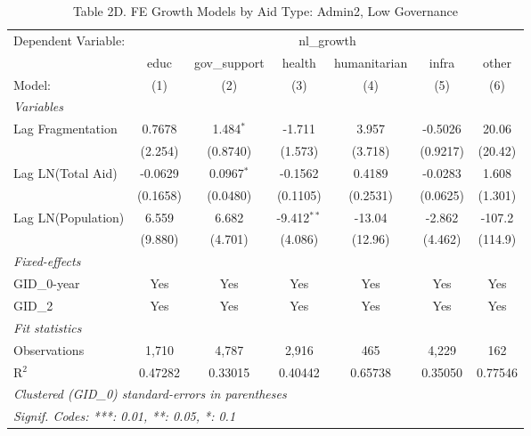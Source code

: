 \begin{table}[htbp]
   \caption{Table 2D. FE Growth Models by Aid Type: Admin2, Low Governance}
   \centering
   \begin{tabular}{lcccccc}
      \tabularnewline \midrule \midrule
      Dependent Variable: & \multicolumn{6}{c}{nl\_growth}\\
                         & educ     & gov\_support  & health        & humanitarian & infra    & other \\   
      Model:             & (1)      & (2)           & (3)           & (4)          & (5)      & (6)\\  
      \midrule
      \emph{Variables}\\
      Lag Fragmentation  & 0.7678   & 1.484$^{*}$   & -1.711        & 3.957        & -0.5026  & 20.06\\   
                         & (2.254)  & (0.8740)      & (1.573)       & (3.718)      & (0.9217) & (20.42)\\   
      Lag LN(Total Aid)  & -0.0629  & 0.0967$^{*}$  & -0.1562       & 0.4189       & -0.0283  & 1.608\\   
                         & (0.1658) & (0.0480)      & (0.1105)      & (0.2531)     & (0.0625) & (1.301)\\   
      Lag LN(Population) & 6.559    & 6.682         & -9.412$^{**}$ & -13.04       & -2.862   & -107.2\\   
                         & (9.880)  & (4.701)       & (4.086)       & (12.96)      & (4.462)  & (114.9)\\   
      \midrule
      \emph{Fixed-effects}\\
      GID\_0-year        & Yes      & Yes           & Yes           & Yes          & Yes      & Yes\\  
      GID\_2             & Yes      & Yes           & Yes           & Yes          & Yes      & Yes\\  
      \midrule
      \emph{Fit statistics}\\
      Observations       & 1,710    & 4,787         & 2,916         & 465          & 4,229    & 162\\  
      R$^2$              & 0.47282  & 0.33015       & 0.40442       & 0.65738      & 0.35050  & 0.77546\\  
      \midrule \midrule
      \multicolumn{7}{l}{\emph{Clustered (GID\_0) standard-errors in parentheses}}\\
      \multicolumn{7}{l}{\emph{Signif. Codes: ***: 0.01, **: 0.05, *: 0.1}}\\
   \end{tabular}
\end{table}



